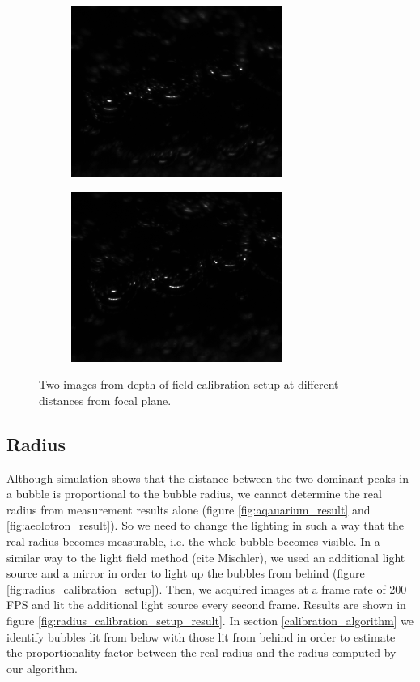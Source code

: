 			\begin{figure}
				\begin{subfigure}[b]{.55\textwidth}
					\centering
					\includegraphics[scale=.5]{images/dof_calib_1.png}
					\caption{}
				\end{subfigure}%
				\begin{subfigure}[b]{.55\textwidth}
					\centering
					\includegraphics[scale=.5]{images/dof_calib_2.png}
					\caption{}
				\end{subfigure}
				
				\caption{Two images from depth of field calibration setup at different distances from focal plane.}								
				\label{fig:depth_of_field_setup_result}
			\end{figure}
			
			
		\subsection{Radius}\label{sub:radius_setup}
			Although simulation shows that the distance between the two dominant peaks in a bubble is proportional to the bubble radius, we cannot determine the real radius from measurement results alone (figure \ref{fig:aqauarium_result} and \ref{fig:aeolotron_result}). So we need to change the lighting in such a way that the real radius becomes measurable, i.e. the whole bubble becomes visible. In a similar way to the light field method (cite Mischler), we used an additional light source and a mirror in order to light up the bubbles from behind (figure \ref{fig:radius_calibration_setup}). Then, we acquired images at a frame rate of 200 FPS and lit the additional light source every second frame. Results are shown in figure \ref{fig:radius_calibration_setup_result}. In section \ref{calibration_algorithm} we identify bubbles lit from below with those lit from behind in order to estimate the proportionality factor between the real radius and the radius computed by our algorithm. 
			

